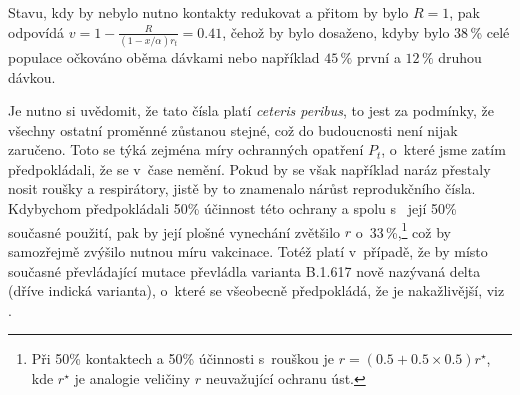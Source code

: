 Stavu, kdy by nebylo nutno kontakty redukovat a přitom by bylo $R=1$,
pak odpovídá $v=1-\frac{R}{(1-x/\alpha)r_{t}}=0.41$, čehož by bylo dosaženo, kdyby bylo 38\,\% celé populace očkováno oběma dávkami nebo
například $45\,\%$ první a $12\,\%$ druhou dávkou.

Je nutno si uvědomit, že tato čísla platí \emph{ceteris peribus},
to jest za podmínky, že všechny ostatní proměnné zůstanou stejné, což do budoucnosti není nijak zaručeno.
Toto se týká zejména míry ochranných opatření $P_{t}$, o~které jsme zatím
předpokládali, že se v~čase nemění. Pokud by se však například
naráz přestaly nosit roušky a respirátory, jistě by to znamenalo nárůst
reprodukčního čísla. Kdybychom před\-po\-klá\-da\-li 50\%
účinnost této ochrany a spolu s~\cite{paqcovid} její 50\% současné
použití, pak by její plošné vynechání zvětšilo $r$ o~33\,\%,\footnote{Při 50\% kontaktech a 50\% účinnosti s~rouškou je $r=(0.5+0.5\times0.5)r^{\star}$,
kde $r^{\star}$ je analogie veličiny $r$ neuvažující ochranu úst.} což by samozřejmě zvýšilo nutnou míru vakcinace. Totéž platí v~případě,
že by místo současné pře\-vlá\-da\-jí\-cí mutace převládla 
varianta B.1.617 nově nazývaná delta (dříve indická varianta), o~které se všeobecně předpokládá, že je nakažlivější,
viz \cite{ecdc2021india}. 

